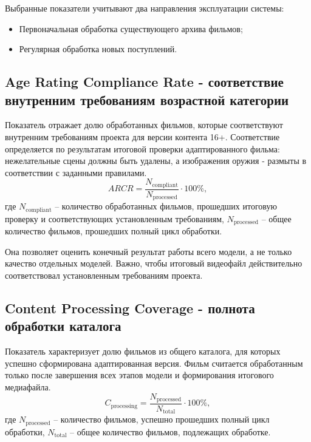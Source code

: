 \documentclass[a4paper,14pt]{extarticle}
\begin{document}
    Выбранные показатели учитывают два направления эксплуатации системы:
    \begin{itemize}
        \item Первоначальная обработка существующего архива фильмов;
        \item Регулярная обработка новых поступлений.
    \end{itemize}

    \subsection{Age Rating Compliance Rate - соответствие внутренним требованиям возрастной категории}
    Показатель отражает долю обработанных фильмов, которые соответствуют внутренним требованиям проекта для версии контента 16+. 
    Соответствие определяется по результатам итоговой проверки адаптированного фильма: нежелательные сцены должны быть удалены, а изображения оружия - размыты в соответствии с заданными правилами.
    \begin{equation*}
        \displaystyle ARCR = \frac{N_{\text{compliant}}}{N_{\text{processed}}} \cdot 100 \%,
    \end{equation*}
    где $N_{\text{compliant}}$ -- количество обработанных фильмов, прошедших итоговую проверку и соответствующих установленным требованиям, $N_{\text{processed}}$ -- общее количество фильмов, прошедших полный цикл обработки.

    Она позволяет оценить конечный результат работы всего модели, а не только качество отдельных моделей. 
    Важно, чтобы итоговый видеофайл действительно соответствовал установленным требованиям проекта.

    \subsection{Content Processing Coverage - полнота обработки каталога}
    Показатель характеризует долю фильмов из общего каталога, для которых успешно сформирована адаптированная версия. 
    Фильм считается обработанным только после завершения всех этапов модели и формирования итогового медиафайла.
    \begin{equation*}
        \displaystyle C_{\text{processing}} = \frac{N_{\text{processed}}}{N_{\text{total}}} \cdot 100 \%,
    \end{equation*}
    где $N_{\text{processed}}$ -- количество фильмов, успешно прошедших полный цикл обработки, $N_{\text{total}}$ -- общее количество фильмов, подлежащих обработке.
\end{document}

